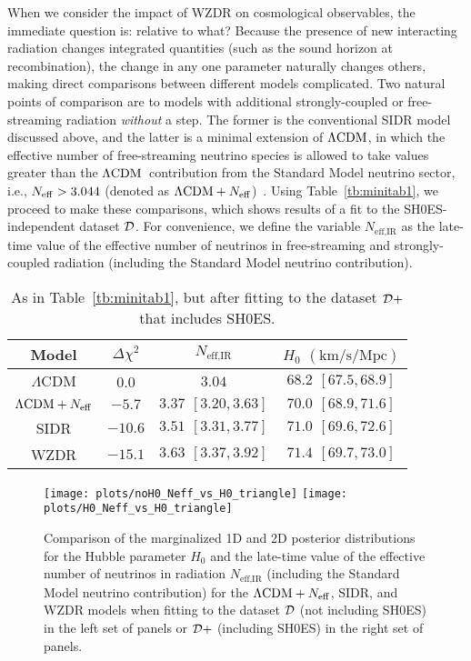 \documentclass[aps,prd,twocolumn,nofootinbib,superscriptaddress]{revtex4}
\newcommand{\D}{\cal{D}}
\newcommand{\ksm}{\text{km} / \text{s} / \text{Mpc}}
\newcommand{\Tab}[1]{Table~\ref{tb:#1}}
\def\lcdm{$\Lambda{\rm CDM}$}
\newcommand{\Neff}{N_{\rm eff}}
\begin{document}
When we consider the impact of WZDR on cosmological observables, the immediate question is: relative to what? Because the presence of new interacting radiation changes integrated quantities (such as the sound horizon at recombination), the change in any one parameter naturally changes others, making direct comparisons between different models complicated. Two natural points of comparison are to models with additional strongly-coupled  or free-streaming radiation  \textit{without} a step. The former is the conventional SIDR model discussed above, and the latter is a minimal extension of \lcdm, in which the effective number of free-streaming neutrino species is allowed to take values greater than the \lcdm\ contribution from the Standard Model neutrino sector, i.e., $\Neff > 3.044$ (denoted as $\Lambda \text{CDM} + \Neff$)~\cite{Froustey:2020mcq,Bennett:2019ewm,Akita:2020szl}. Using  \Tab{minitab1}, we proceed to make these comparisons, which shows results of a fit to the SH0ES-independent dataset $\D$. For convenience, we define the variable $N_\text{eff,IR}$ as the late-time value of the effective number of neutrinos in free-streaming and strongly-coupled radiation (including the Standard Model neutrino contribution).

\begin{table}[t!]
	\setlength\extrarowheight{3pt}
	\centering
	\begin{tabular}{|c || c | c | c |} 
		\hline
		Model& $\Delta \chi^2$ & $N_\text{eff,IR}$ & $H_0$ $(\ksm)$  \\
		\hline \hline
		$\text{$\Lambda$CDM}$ & 0.0 & $3.04$ & $68.2 ~\, [67.5,68.9]$ \\  \hline
		$\text{$\Lambda$CDM} + \Neff$ & $-5.7$ & $3.37 ~\, [3.20,3.63]$ & $70.0 ~\, [68.9,71.6]$ \\  \hline
		SIDR & $-10.6$ & $3.51 ~\, [3.31,3.77]$ & $71.0 ~\, [69.6, 72.6]$\\ \hline
		WZDR & $-15.1$ & $3.63 ~\, [3.37,3.92]$ & $71.4 ~\, [69.7,73.0]$ \\
		\hline
	\end{tabular}
	\caption{As in \Tab{minitab1}, but after fitting to the dataset $\D+$ that includes SH0ES.}
	\label{tb:minitab1a}
\end{table}

\begin{figure*}[t]
\centering
\texttt{[image: plots/noH0\_Neff\_vs\_H0\_triangle]}\hskip 0.1in
\texttt{[image: plots/H0\_Neff\_vs\_H0\_triangle]}   \caption{Comparison of the marginalized 1D and 2D posterior distributions for the Hubble parameter $H_0$ and the late-time value of the effective number of neutrinos in radiation $N_\text{eff,IR}$ (including the Standard Model neutrino contribution) for the $\Lambda \text{CDM} + \Neff$, SIDR, and WZDR models when fitting to the dataset $\D$ (not including SH0ES) in the left set of panels or $\D+$ (including SH0ES) in the right set of panels.}
\label{fig:h0plots}
\end{figure*}
\end{document}
